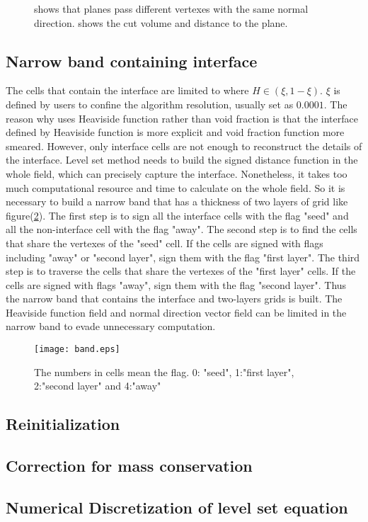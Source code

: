 \begin{figure}[htbp]
\centering
{}
\quad
{}
\caption{ shows that planes pass different vertexes with the same normal direction.  shows the cut volume and distance to the plane.}
\label{fig:multi}
\end{figure}

\subsection{Narrow band containing interface}
The cells that contain the interface are limited to where $H\in(\xi,1-\xi)$. $\xi$ is defined by users to confine the algorithm resolution, usually set as $0.0001$. The reason why uses Heaviside function rather than void fraction is that the interface defined by Heaviside function is more explicit and void fraction function more smeared. However, only interface cells are not enough to reconstruct the details of the interface. Level set method needs to build the signed distance function in the whole field, which can precisely capture the interface. Nonetheless, it takes too much computational resource and time to calculate on the whole field. So it is necessary to build a narrow band that has a thickness of two layers of grid like figure(\ref{fig:NarrowBand}). The first step is to sign all the interface cells with the flag "seed" and all the non-interface cell with the flag "away". The second step is to find the cells that share the vertexes of the "seed" cell. If the cells are signed with flags including "away" or "second layer", sign them with the flag "first layer". The third step is to traverse the cells that share the vertexes of the "first layer" cells. If the cells are signed with flags "away", sign them with the flag "second layer". Thus the narrow band that contains the interface and two-layers grids is built. The Heaviside function field and normal direction vector field can be limited in the narrow band to evade unnecessary computation.
\begin{figure}[htbp]
\centering
\texttt{[image: band.eps]}
\caption{The numbers in cells mean the flag. 0: "seed", 1:"first layer", 2:"second layer" and 4:"away"}
\label{fig:NarrowBand}
\end{figure}

\subsection{Reinitialization}

\subsection{Correction for mass conservation}

\subsection{Numerical Discretization of level set equation}

